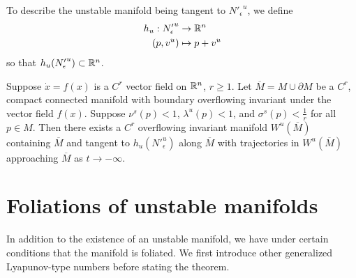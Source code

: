 To describe the unstable manifold being tangent to \({N'_\epsilon}^u\), we define 
\begin{equation}
\begin{aligned}
	h_u : {N'_\epsilon}^u &\to \mathbb{R}^n \\
	(p, v^u) &\mapsto  p + v^u
\end{aligned}
\end{equation}
so that \(h_u({N'_\epsilon}^u) \subset \mathbb{R}^n\).

\begin{theorem}\label{unstable-manifold-fenichel}
	Suppose \(\dot x = f(x)\) is a \(C^r\) vector field on \(\mathbb{R}^n\), \(r\geq 1\). Let \(\overline M = M \cup \partial M\) be a \(C^r\), compact connected manifold with boundary overflowing invariant under the vector field \(f(x)\). Suppose \(\nu^s(p) < 1\), \(\lambda^u(p) < 1\), and \(\sigma^s(p) < \frac 1 r\) for all \(p\in M\). Then there exists a \(C^r\) overflowing invariant manifold \(W^u(\overline M)\) containing \(\overline M\) and tangent to \(h_u(N'^u_\epsilon )\) along \(\overline M\) with trajectories in \(W^u(\overline M)\) approaching \(\overline M\) as \(t\to -\infty\).
\end{theorem}

\section{Foliations of unstable manifolds}

In addition to the existence of an unstable manifold, we have under certain conditions that the manifold is foliated. We first introduce other generalized Lyapunov-type numbers before stating the theorem.

